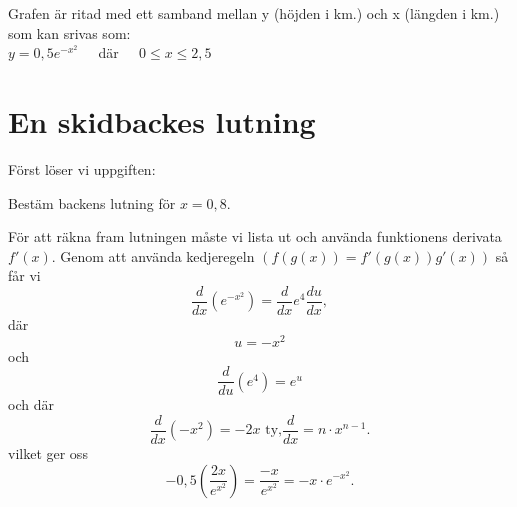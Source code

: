 \documentclass[a4paper,12pt]{article}
\begin{document}
\noindent
{}\newline
Grafen är ritad med ett samband mellan y (höjden i km.) och x (längden i km.) som kan srivas som:\\
$y = 0,5e^{-x^2}$ $\>$ $\>$ där $\>$ $\>$ $0 \leq x \leq 2,5$\\
\section{En skidbackes lutning}
\label{sec:uppg1}
  Först löser vi uppgiften:\\
  \begin{addmargin}[1em]{1em}
    Bestäm backens lutning för $x = 0,8$.\\
  \end{addmargin}
  För att räkna fram lutningen måste vi lista ut och använda funktionens derivata $f'(x)$. Genom att använda kedjeregeln $(f(g(x)) = f'(g(x))g'(x))$ så får vi
  \begin{equation}
    \frac{d}{dx}\left(e^{-x^2}\right) = \frac{d}{dx}e^4\frac{du}{dx},
  \end{equation}
  där
  \begin{displaymath}
    u = -x^2
  \end{displaymath}
  och
  \begin{displaymath}
    \frac{d}{du}\left(e^4\right) = e^u
  \end{displaymath}
  och där
  \begin{displaymath}
    \frac{d}{dx}\left(-x^2\right) = -2x \text{ ty,} \frac{d}{dx} = n \cdot x^{n-1}.
  \end{displaymath}
  vilket ger oss
  \begin{displaymath}
    -0,5\left(\frac{2x}{e^{x^2}}\right) = \frac{-x}{e^{x^2}} = -x \cdot e^{-x^2}.
  \end{displaymath}
\end{document}
